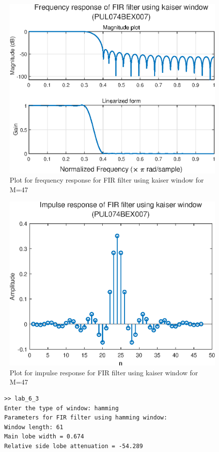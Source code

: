 \documentclass{lab_sheet}
\begin{document}
\begin{figure}[H]
    \centering
    \includegraphics[width=0.65\linewidth]{../Figures/kaiser-fir.eps}
    \caption{Plot for frequency response for FIR filter using kaiser window for M=47}
    \label{fig:kaiser-fir}
\end{figure}

\begin{figure}[H]
    \centering
    \includegraphics[width=0.65\linewidth]{../Figures/kaiser-imp.eps}
    \caption{Plot for impulse response for FIR filter using kaiser window for M=47}
    \label{fig:kaiser-imp}
\end{figure}
\pagebreak
\begin{verbatim}
    >> lab_6_3
    Enter the type of window: hamming
    Parameters for FIR filter using hamming window:
    Window length: 61
    Main lobe width = 0.674
    Relative side lobe attenuation = -54.289
\end{verbatim}
\end{document}
